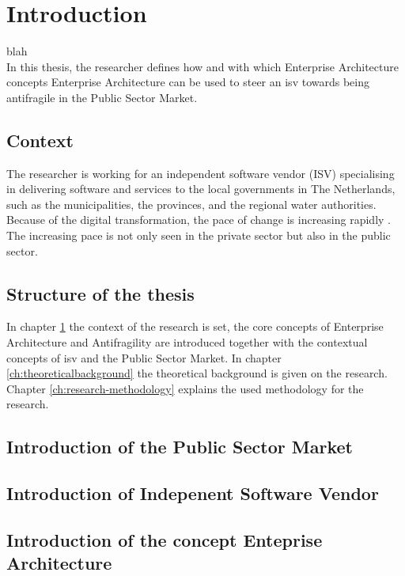 \chapter{Introduction}
\label{ch:introduction}
blah\\

In this thesis, the researcher defines how and with which Enterprise Architecture concepts Enterprise Architecture can be used to steer an \acrfull{isv} towards being \gls{antifragile} in the Public Sector Market.

\section{Context}
\label{sec:context}
The researcher is working for an independent software vendor (ISV) specialising in delivering software and services to the local governments in The Netherlands, such as the municipalities, the provinces, and the regional water authorities. Because of the digital transformation, the pace of change is increasing rapidly \needsref. The increasing pace is not only seen in the private sector but also in the public sector. 

\section{Structure of the thesis}
\label{sec:structure}
In chapter \ref{ch:introduction} the context of the research is set, the core concepts of Enterprise Architecture and Antifragility are introduced together with the contextual concepts of \acrshort{isv} and the Public Sector Market. In chapter \ref{ch:theoreticalbackground} the theoretical background is given on the research. Chapter \ref{ch:research-methodology} explains the used methodology for the research.

\section{Introduction of the Public Sector Market}
\label{sec:intropublicsector}
\lipsum[1]

\section{Introduction of Indepenent Software Vendor}
\label{sec:introisv}
\lipsum[1]

\section{Introduction of the concept Enteprise Architecture}
\label{introea}
\lipsum[1]


